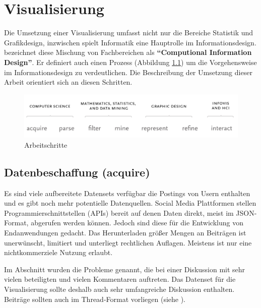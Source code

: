 \documentclass[nobib, nohyper, a4paper,openany]{tufte-book}
\begin{document}
\chapter{Visualisierung}


Die Umsetzung einer Visualisierung umfasst nicht nur die Bereiche Statistik und Grafikdesign,
inzwischen spielt Informatik eine Hauptrolle im Informationsdesign.
\citeauthor{FryComputationalinformationdesign2004} \cite{FryComputationalinformationdesign2004}
bezeichnet diese Mischung von Fachbereichen als  \textbf{``Computional Information Design''}. 
Er definiert auch einen Prozess (Abbildung \ref{fig:fry-steps}) um die Vorgehensweise im Informationsdesign zu verdeutlichen. 
Die Beschreibung der Umsetzung dieser Arbeit orientiert sich an diesen Schritten.
\begin{figure}
  \label{fig:fry-steps}
  \caption{ Arbeitschritte \cite[164]{FryComputationalinformationdesign2004}}  
    \includegraphics[width=\textwidth]{figures/fry_steps.png} 
\end{figure} 


\section{Datenbeschaffung (acquire)}
Es sind viele aufbereitete Datensets verfügbar die Postings von Usern enthalten und es 
gibt noch mehr potentielle Datenquellen. 
Social Media Plattformen stellen Programmierschnittstellen (APIs) bereit auf denen Daten direkt,
meist im JSON-Format, abgerufen werden können. 
Jedoch sind diese für die Entwicklung von Endanwendungen gedacht.
Das Herunterladen größer Mengen an Beiträgen ist unerwünscht, limitiert und unterliegt
rechtlichen Auflagen. Meistens ist nur eine nichtkommerziele Nutzung erlaubt.

Im Abschnitt  wurden die Probleme genannt, die bei einer Diskussion mit sehr vielen
beteiligten und vielen Kommentaren auftreten. 
Das Datenset für die Visualisierung sollte deshalb auch sehr umfangreiche Diskussion enthalten.
Beiträge sollten auch im Thread-Format vorliegen (siehe ).
\end{document}
